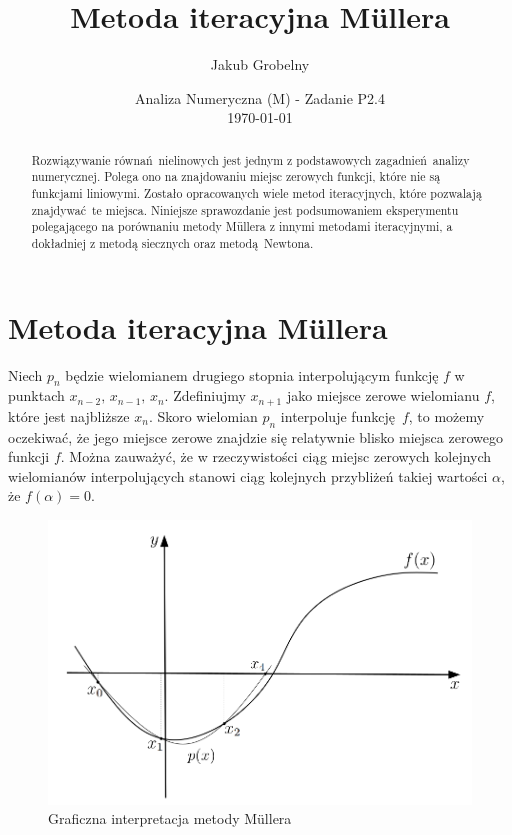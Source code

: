 \documentclass[12pt]{article}
\title{\huge Metoda iteracyjna Müllera}
\date{Analiza Numeryczna (M) - Zadanie P2.4\\ \today}
\author{\Large Jakub Grobelny}
\begin{document}
\begin{titlepage}
\maketitle
\thispagestyle{empty}

\begin{abstract}
    Rozwiązywanie równań nielinowych jest jednym z podstawowych zagadnień analizy
    numerycznej. Polega ono na znajdowaniu miejsc zerowych funkcji, które nie są
    funkcjami liniowymi. Zostało opracowanych wiele metod iteracyjnych, które
    pozwalają znajdywać te miejsca. Niniejsze sprawozdanie jest podsumowaniem
    eksperymentu polegającego na porównaniu metody Müllera z innymi metodami 
    iteracyjnymi, a dokładniej z metodą siecznych oraz metodą Newtona.
\end{abstract}

\end{titlepage}

\newpage
\tableofcontents
\newpage

\section{Metoda iteracyjna Müllera}

Niech $p_n$ będzie wielomianem drugiego stopnia interpolującym funkcję $f$ w
punktach $x_{n-2},\, x_{n-1},\, x_n$. Zdefiniujmy $x_{n+1}$ jako miejsce zerowe
wielomianu $f$, które jest najbliższe $x_n$. Skoro wielomian $p_n$ interpoluje
funkcję $f$, to możemy oczekiwać, że jego miejsce zerowe znajdzie się relatywnie
blisko miejsca zerowego funkcji $f$. Można zauważyć, że w rzeczywistości ciąg 
miejsc zerowych kolejnych wielomianów interpolujących stanowi ciąg kolejnych
przybliżeń takiej wartości $\alpha$, że $f(\alpha) = 0$.

\begin{figure}[H]
    \centering
    \includegraphics[scale=0.55]{plot_muller.png}
\caption{Graficzna interpretacja metody Müllera}
\label{figure:fig0}
\end{figure}
\end{document}
